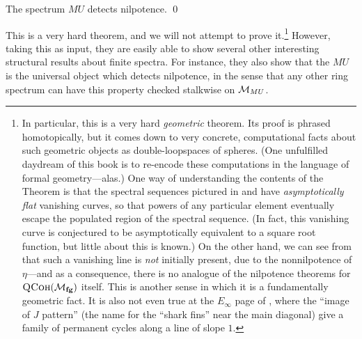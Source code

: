 \begin{theorem}\label{DevinatzHopkinsSmith}
The spectrum \(MU\) detects nilpotence. \qed
\end{theorem}

\noindent This is a very hard theorem, and we will not attempt to prove it.\footnote{In particular, this is a very hard \emph{geometric} theorem.  Its proof is phrased homotopically, but it comes down to very concrete, computational facts about such geometric objects as double-loopspaces of spheres.  (One unfulfilled daydream of this book is to re-encode these computations in the language of formal geometry---alas.)  One way of understanding the contents of the Theorem is that the spectral sequences pictured in  and  have \emph{asymptotically flat} vanishing curves, so that powers of any particular element eventually escape the populated region of the spectral sequence.  (In fact, this vanishing curve is conjectured to be asymptotically equivalent to a square root function, but little about this is known.)  On the other hand, we can see from  that such a vanishing line is \emph{not} initially present, due to the nonnilpotence of \(\eta\)---and as a consequence, there is no analogue of the nilpotence theorems for \(\normalfont\textsc{QCoh}(\mathcal{M}_{\mathbf{fg}})\) itself.  This is another sense in which it is a fundamentally geometric fact.  It is also not even true at the \(E_\infty\) page of , where the ``image of \(J\) pattern'' (the name for the ``shark fins'' near the main diagonal) give a family of permanent cycles along a line of slope \(1\).}
However, taking this as input, they are easily able to show several other interesting structural results about finite spectra.  For instance, they also show that the \(MU\) is the universal object which detects nilpotence, in the sense that any other ring spectrum can have this property checked stalkwise on \(\mathcal{M}_{MU}\).


